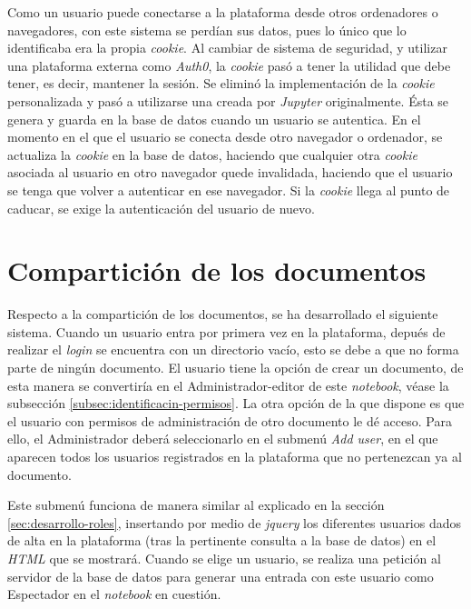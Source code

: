 \documentclass[11pt,spanish,listoffigures]{tfgetsinf}
\begin{document}
Como un usuario puede conectarse a la plataforma desde otros ordenadores o navegadores, con este sistema se perdían sus datos, pues lo único que lo identificaba era la propia \textit{cookie}. Al cambiar de sistema de seguridad, y utilizar una plataforma externa como \textit{Auth0}, la \textit{cookie} pasó a tener la utilidad que debe tener, es decir, mantener la sesión. Se eliminó la implementación de la \textit{cookie} personalizada y pasó a utilizarse una creada por \textit{Jupyter} originalmente. Ésta se genera y guarda en la base de datos cuando un usuario se autentica. En el momento en el que el usuario se conecta desde otro navegador o ordenador, se actualiza la \textit{cookie} en la base de datos, haciendo que cualquier otra \textit{cookie} asociada al usuario en otro navegador quede invalidada, haciendo que el usuario se tenga que volver a autenticar en ese navegador. Si la \textit{cookie} llega al punto de caducar, se exige la autenticación del usuario de nuevo.



\section{Compartición de los documentos}
\label{sec:desarrollo-comparticion}

Respecto a la compartición de los documentos, se ha desarrollado el siguiente sistema. Cuando un usuario entra por primera vez en la plataforma, depués de realizar el \textit{login} se encuentra con un directorio vacío, esto se debe a que no forma parte de ningún documento. El usuario tiene la opción de crear un documento, de esta manera se convertiría en el Administrador-editor de este \textit{notebook}, véase la subsección \ref{subsec:identificacin-permisos}. La otra opción de la que dispone es que el usuario con permisos de administración de otro documento le dé acceso. Para ello, el Administrador deberá seleccionarlo en el submenú \textit{Add user}, en el que aparecen todos los usuarios registrados en la plataforma que no pertenezcan ya al documento.

Este submenú funciona de manera similar al explicado en la sección \ref{sec:desarrollo-roles}, insertando por medio de \textit{jquery} los diferentes usuarios dados de alta en la plataforma (tras la pertinente consulta a la base de datos) en el \textit{HTML} que se mostrará. Cuando se elige un usuario, se realiza una petición al servidor de la base de datos para generar una entrada con este usuario como Espectador en el \textit{notebook} en cuestión.
\end{document}
